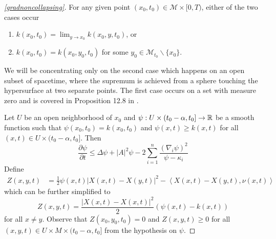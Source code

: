 \begin{proof}[\cref{gradnoncollapsing}]
    For any given point $ (x_{0},t_{0}) \in \mathcal{M} \times [0,T) $, either of the two cases occur
    \begin{enumerate}
        \item $ k(x_{0},t_{0}) = \lim_{y \to x_{0}} k(x_{0},y,t_{0}) $, or 
        \item $ k(x_{0},t_{0}) = k(x_{0}, y_{0},t_{0}) $ for some $ y_{0} \in \mathcal{M}_{t_{0}} \backslash \{x_{0}\} $.
    \end{enumerate}

    We will be concentrating only on the second case which happens on an open subset of spacetime, where the supremum is achieved from a sphere touching the hypersurface at two separate points. The first case occurs on a set with measure zero and is covered in Proposition 12.8 in \cite{andrews2022extrinsic}.
    
    Let $ U $ be an open neighborhood of $ x_{0} $ and $ \psi : U \times (t_{0}-\alpha,t_{0}] \to \mathbb{R} $ be a smooth function such that $ \psi(x_{0},t_{0}) = k(x_{0},t_{0}) $ and $ \psi(x,t) \ge k(x,t) $ for all $ (x,t) \in U \times (t_{0}-\alpha,t_{0}] $. Then \begin{equation}
        \frac{\partial \psi}{\partial t} \le \Delta \psi + |A|^{2}\psi - 2 \sum_{i=1}^{n} \frac{ (\nabla_{i}\psi)^{2}}{\psi-\kappa_{i}} 
    \end{equation}
    Define \begin{align}
        Z(x,y,t) & = \frac{1}{2}\psi(x,t)|X(x,t)-X(y,t)|^{2} - \left< X(x,t) - X(y,t), \nu(x,t) \right>
    \end{align}
    which can be further simplified to \begin{equation}
        Z(x,y,t) = \frac{|X(x,t)-X(x,t)|^{2}}{2}(\psi(x,t) - k(x,t)) %
    \end{equation}
    for all $ x \neq y $. Observe that $ Z(x_{0},y_{0},t_{0}) = 0 $  and $ Z(x,y,t) \ge 0 $ for all $ (x,y,t) \in U \times M \times (t_{0}-\alpha,t_{0}] $ from the hypothesis on $ \psi $. 


\end{proof}
